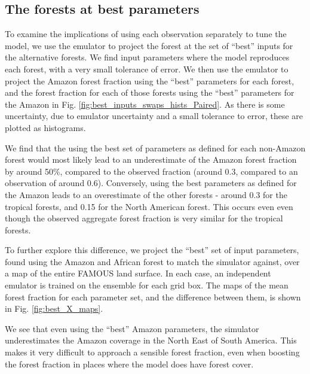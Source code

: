 \documentclass[esd, article]{copernicus} %
\begin{document}


\subsection{The forests at best parameters}\label{ssec:bestparameters}
To examine the implications of using each observation separately to tune the model, we use the emulator to project the forest at the set of ``best'' inputs for the alternative forests. We find input parameters where the model reproduces each forest, with a very small tolerance of error. We then use the emulator to project the Amazon forest fraction using the ``best'' parameters for each forest, and the forest fraction for each of those forests using the ``best'' parameters for the Amazon in Fig. \ref{fig:best_inputs_swaps_hists_Paired}. As there is some uncertainty, due to emulator uncertainty and a small tolerance to error, these are plotted as histograms.

We find that the using the best set of parameters as defined for each non-Amazon forest would most likely lead to an underestimate of the Amazon forest fraction by around 50\%, compared to the observed fraction (around 0.3, compared to an observation of around 0.6). Conversely, using the best parameters as defined for the Amazon leads to an overestimate of the other forests - around 0.3 for the tropical forests, and 0.15 for the North American forest. This occurs even even though the observed aggregate forest fraction is very similar for the tropical forests.


To further explore this difference, we project the ``best'' set of input parameters, found using the Amazon and African forest to match the simulator against, over a map of the entire FAMOUS land surface. In each case, an independent emulator is trained on the ensemble for each grid box. The maps of the mean forest fraction for each parameter set, and the difference between them, is shown in Fig.  \ref{fig:best_X_maps}.


We see that even using the ``best'' Amazon parameters, the simulator underestimates the Amazon coverage in the North East of South America. This makes it very difficult to approach a sensible forest fraction, even when boosting the forest fraction in places where the model does have forest cover.
\end{document}
